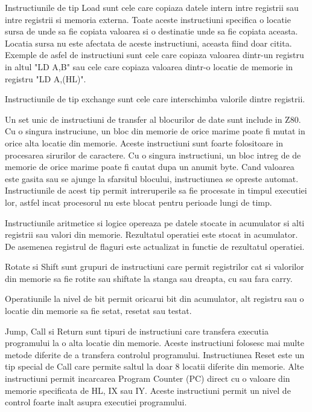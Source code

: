 \documentclass[titlepage,12pt]{article}
\begin{document}
Instructiunile de tip Load sunt cele care copiaza datele intern intre registrii sau intre registrii si memoria externa.
Toate aceste instructiuni specifica o locatie sursa de unde sa fie copiata valoarea si o destinatie unde sa fie copiata aceasta.
Locatia sursa nu este afectata de aceste instructiuni, aceasta fiind doar citita.
Exemple de asfel de instructiuni sunt cele care copiaza valoarea dintr-un registru in altul "LD A,B" sau cele care copiaza valoarea dintr-o locatie de memorie in registru "LD A,(HL)".

Instructiunile de tip exchange sunt cele care interschimba valorile dintre registrii.

Un set unic de instructiuni de transfer al blocurilor de date sunt include in \ac {Z80}.
Cu o singura instruciune, un bloc din memorie de orice marime poate fi mutat in orice alta locatie din memorie.
Aceste instructiuni sunt foarte folositoare in procesarea sirurilor de caractere.
Cu o singura instructiuni, un bloc intreg de de memorie de orice marime poate fi cautat dupa un anumit byte.
Cand valoarea este gasita sau se ajunge la sfarsitul blocului, instructiunea se opreste automat.
Instructiunile de acest tip permit intreruperile sa fie procesate in timpul executiei lor, astfel incat procesorul nu este blocat pentru perioade lungi de timp.

Instructiunile aritmetice si logice opereaza pe datele stocate in acumulator si alti registrii sau valori din memorie.
Rezultatul operatiei este stocat in acumulator.
De asemenea registrul de flaguri este actualizat in functie de rezultatul operatiei.

Rotate si Shift sunt grupuri de instructiuni care permit registrilor cat si valorilor din memorie sa fie rotite sau shiftate la stanga sau dreapta, cu sau fara carry.

Operatiunile la nivel de bit permit oricarui bit din acumulator, alt registru sau o locatie din memorie sa fie setat, resetat sau testat.

Jump, Call si Return sunt tipuri de instructiuni care transfera executia programului la o alta locatie din memorie.
Aceste instructiuni folosesc mai multe metode diferite de a transfera controlul programului.
Instructiunea Reset este un tip special de Call care permite saltul la doar 8 locatii diferite din memorie.
Alte instructiuni permit incarcarea Program Counter (PC) direct cu o valoare din memorie specificata de HL, IX sau IY.
Aceste instructiuni permit un nivel de control foarte inalt asupra executiei programului.
\end{document}
